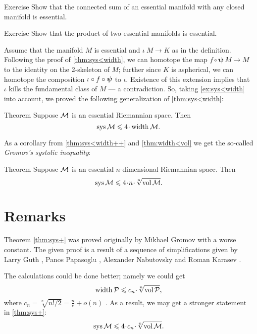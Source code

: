 \begin{thm}{Exercise}\label{ex:connected-sum-essential}
Show that the connected sum of an essential manifold with any closed manifold is essential.
\end{thm}

\begin{thm}{Exercise}\label{ex:product-essential}
Show that the product of two essential manifolds is essential.
\end{thm}

Assume that the manifold $M$ is essential and $\iota \:M\to K$ as in the definition.
Following the proof of \ref{thm:sys<width}, we can homotope the map 
$f\circ\bm{\psi}\:M\to M$ to the identity on the 2-skeleton of $M$;
further since $K$ is aspherical, we can homotope the composition
$\iota\z\circ f\circ\bm{\psi}$ to  $\iota$. 
Existence of this extension implies that $\iota$ kills the fundamental class of $M$ --- a contradiction.
So, taking \ref{ex:sys<width} into account, we proved the following generalization of \ref{thm:sys<width}:

\begin{thm}{Theorem}\label{thm:sys<width++}
Suppose $\mathcal{M}$ is an essential Riemannian space.
Then 
\[\sys\spc{M}\le 4 \cdot \width \spc{M}.\]
\end{thm}

As a corollary from \ref{thm:sys<width++} and \ref{thm:width<vol} we get the so-called \emph{Gromov's systolic inequality}:

\begin{thm}{Theorem}\label{thm:sys+}
Suppose $\mathcal{M}$ is an essential $n$-dimensional Riemannian space.
Then 
\[\sys\spc{M}\le 4 \cdot n\cdot \sqrt[n]{\vol\spc{M}}.\]
\end{thm}


\section{Remarks}

Theorem \ref{thm:sys+} was proved originally by Mikhael Gromov \cite{gromov-1983} with a worse constant.
The given proof is a result of a sequence of simplifications given by Larry Guth \cite{guth},
Panos Papasoglu \cite{papasoglu},
Alexander Nabutovsky and Roman Karasev \cite{nabutovsky}.

The calculations could be done better; namely we could get
\[\width\spc{P}\le c_n\cdot \sqrt[n]{\vol\spc{P}},\]
where
$c_n=\sqrt[n]{n!/2}= \tfrac ne+o(n)$ \cite{nabutovsky}.
As a result, we may get a stronger statement in \ref{thm:sys+}:
\[\sys\spc{M}\le 4 \cdot c_n\cdot \sqrt[n]{\vol\spc{M}}.\]

